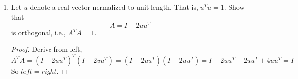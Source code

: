 \documentclass[]{book}
\theoremstyle{definition}
\newtheorem*{soln}{Solution}
\begin{document}
\begin{enumerate}
\begin{soln}
	\begin{enumerate}
		\item one example that satisfies (a) is:
		$$A=\left({\begin{matrix}
			0 & 0 \\ 
			0 & 1
			\end{matrix} }\right), 
		B = \left({\begin{matrix}
			0 & 1 \\ 
			0 & 0
			\end{matrix} }\right)$$
		Calculate left,
		$$left = (A+B)^2 = \left({\begin{matrix}
			0 & 1 \\ 
			0 & 0
			\end{matrix} }\right) \left({\begin{matrix}
			0 & 1 \\ 
			0 & 0
			\end{matrix} }\right) = \left({\begin{matrix}
			0 & 1 \\ 
			0 & 1
			\end{matrix} }\right)$$
		Calculate right,
		$$right = A^2 + 2AB + B^2 = \left({\begin{matrix}
			0 & 0 \\ 
			0 & 1
			\end{matrix} }\right) + \boldsymbol{0} + \boldsymbol{0} = \left({\begin{matrix}
			0 & 0 \\ 
			0 & 1
			\end{matrix} }\right)$$
		And $left \neq right$
		
		\item 	one example that satisfies (b) is:
		$$A=\left({\begin{matrix}
			0 & 0 \\ 
			0 & 1
			\end{matrix} }\right), 
		B = \left({\begin{matrix}
			0 & 1 \\ 
			0 & 0
			\end{matrix} }\right)$$
		where $A\neq 0$, and $B \neq 0$. Calculate $AB$,
		$$AB = \left({\begin{matrix}
			0 & 0 \\ 
			0 & 1
			\end{matrix} }\right) \left({\begin{matrix}
			0 & 1 \\ 
			0 & 0
			\end{matrix} }\right) = \boldsymbol{0} $$		
	\end{enumerate}
\end{soln}

\item Let $u$ denote a real vector normalized to unit length. That is, $u^T u = 1$. Show that
$$A = I - 2 u u^T $$
is orthogonal, i.e., $A^T A = 1$.
\begin{proof}
	Derive from left,
	$$A^T A = (I-2u u^T)^T(I-2u u^T) =(I-2u u^T)(I-2u u^T) = I-2u u^T - 2u u^T + 4 u u^T = I$$
	So $left = right$.	
\end{proof}

\end{enumerate}
\end{document}
